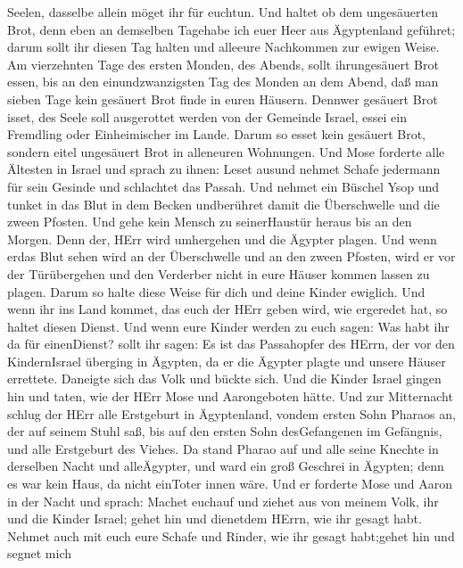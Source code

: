 Seelen, dasselbe allein möget ihr für euchtun.  Und haltet
ob dem ungesäuerten Brot, denn eben an demselben Tagehabe ich euer Heer
aus Ägyptenland geführet; darum sollt ihr diesen Tag halten und alleeure
Nachkommen zur ewigen Weise.  Am vierzehnten Tage des
ersten Monden, des Abends, sollt ihrungesäuert Brot essen, bis an den
einundzwanzigsten Tag des Monden an dem Abend,  daß man
sieben Tage kein gesäuert Brot finde in euren Häusern. Dennwer gesäuert
Brot isset, des Seele soll ausgerottet werden von der Gemeinde Israel,
essei ein Fremdling oder Einheimischer im Lande.  Darum so
esset kein gesäuert Brot, sondern eitel ungesäuert Brot in alleneuren
Wohnungen.  Und Mose forderte alle Ältesten in Israel und
sprach zu ihnen: Leset ausund nehmet Schafe jedermann für sein Gesinde
und schlachtet das Passah.  Und nehmet ein Büschel Ysop und
tunket in das Blut in dem Becken undberühret damit die Überschwelle und
die zween Pfosten. Und gehe kein Mensch zu seinerHaustür heraus bis an
den Morgen.  Denn der, HErr wird umhergehen und die Ägypter
plagen. Und wenn erdas Blut sehen wird an der Überschwelle und an den
zween Pfosten, wird er vor der Türübergehen und den Verderber nicht in
eure Häuser kommen lassen zu plagen.  Darum so halte diese
Weise für dich und deine Kinder ewiglich.  Und wenn ihr ins
Land kommet, das euch der HErr geben wird, wie ergeredet hat, so haltet
diesen Dienst.  Und wenn eure Kinder werden zu euch sagen:
Was habt ihr da für einenDienst?  sollt ihr sagen: Es ist
das Passahopfer des HErrn, der vor den KindernIsrael überging in
Ägypten, da er die Ägypter plagte und unsere Häuser errettete. Daneigte
sich das Volk und bückte sich.  Und die Kinder Israel
gingen hin und taten, wie der HErr Mose und Aarongeboten hätte.
 Und zur Mitternacht schlug der HErr alle Erstgeburt in
Ägyptenland, vondem ersten Sohn Pharaos an, der auf seinem Stuhl saß,
bis auf den ersten Sohn desGefangenen im Gefängnis, und alle Erstgeburt
des Viehes.  Da stand Pharao auf und alle seine Knechte in
derselben Nacht und alleÄgypter, und ward ein groß Geschrei in Ägypten;
denn es war kein Haus, da nicht einToter innen wäre.  Und
er forderte Mose und Aaron in der Nacht und sprach: Machet euchauf und
ziehet aus von meinem Volk, ihr und die Kinder Israel; gehet hin und
dienetdem HErrn, wie ihr gesagt habt.  Nehmet auch mit euch
eure Schafe und Rinder, wie ihr gesagt habt;gehet hin und segnet mich
